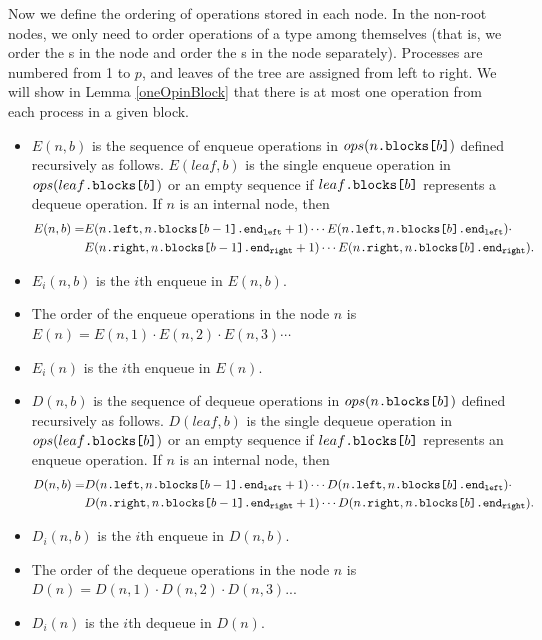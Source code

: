 \documentclass[acmsmall,nonacm,anonymous]{acmart}
\newcommand{\sub}[1]{\textsubscript{#1}}
\newcommand{\nf}[1]{{\normalfont{\texttt{#1}}}}
\begin{document}
Now we define the ordering of operations stored in each node. In the non-root nodes, we only need to order operations of a type among themselves (that is, we order the \nf{Enqueue}s in the node and order the \nf{Dequeue}s in the node separately). Processes are numbered from 1 to $p$, and leaves of the tree are assigned from left to right. We will show in Lemma \ref{oneOpinBlock} that there is at most one operation from each process in a given block.
\begin{definition}  \label{ordering}
\end{definition}
\begin{itemize}
  \item $E(n,b)$ is the sequence of enqueue operations in $ops(n\nf{.blocks[}b\nf{]})$ defined recursively as follows. $E(leaf,b)$ is the single enqueue operation in $ops(leaf\nf{.blocks[}b\nf{]})$ or an empty sequence if $leaf\nf{.blocks[}b\nf{]}$ represents a dequeue operation. If $n$ is an internal node, then
\begin{align*} 
E(n,b) =&  E(n\nf{.left},n\nf{.blocks[}b-1\nf{].end\sub{left}}+1)\cdots E(n\nf{.left},n\nf{.blocks[}b\nf{].end\sub{left}})\cdot \\ 
&E(n\nf{.right},n\nf{.blocks[}b-1\nf{].end\sub{right}}+1)\cdots E(n\nf{.right},n\nf{.blocks[}b\nf{].end\sub{right}}).
\end{align*}
  \item $E_i(n,b)$ is the $i$th enqueue in $E(n,b)$.
\item The order of the enqueue operations in the node $n$ is $E(n)=E(n,1)\cdot E(n,2)\cdot E(n,3)\cdots$
\item $E_i(n)$ is the $i$th enqueue in $E(n)$.
  \item $D(n,b)$ is the sequence of dequeue operations in $ops(n\nf{.blocks[}b\nf{]})$ defined recursively as follows. $D(leaf,b)$ is the single dequeue operation in $ops(leaf\nf{.blocks[}b\nf{]})$ or an empty sequence if $leaf\nf{.blocks[}b\nf{]}$ represents an enqueue operation. If $n$ is an internal node, then
\begin{align*} 
D(n,b) =&  D(n\nf{.left},n\nf{.blocks[}b-1\nf{].end\sub{left}}+1)\cdots D(n\nf{.left}, n\nf{.blocks[}b\nf{].end\sub{left}})\cdot \\ 
&D(n\nf{.right},n\nf{.blocks[}b-1\nf{].end\sub{right}}+1)\cdots D(n\nf{.right},n\nf{.blocks[}b\nf{].end\sub{right}}).
\end{align*}
    \item $D_i(n,b)$ is the $i$th enqueue in $D(n,b)$.
\item The order of the dequeue operations in the node $n$ is $D(n)=D(n,1)\cdot D(n,2)\cdot D(n,3)...$
\item $D_i(n)$ is the $i$th dequeue in $D(n)$.
\end{itemize}
\end{document}
